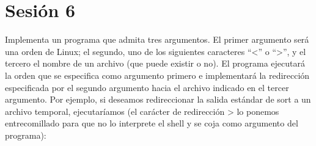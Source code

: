 \section{Sesión 6}

\begin{exercise}
Implementa un programa que admita tres argumentos. El primer argumento será
una orden de Linux; el segundo, uno de los siguientes caracteres “<” o “>”, y el tercero el
nombre de un archivo (que puede existir o no). El programa ejecutará la orden que se
especifica como argumento primero e implementará la redirección especificada por el
segundo argumento hacia el archivo indicado en el tercer argumento. Por ejemplo, si
deseamos redireccionar la salida estándar de sort a un archivo temporal, ejecutaríamos (el
carácter de redirección > lo ponemos entrecomillado para que no lo interprete el shell y se
coja como argumento del programa):
\end{exercise}
